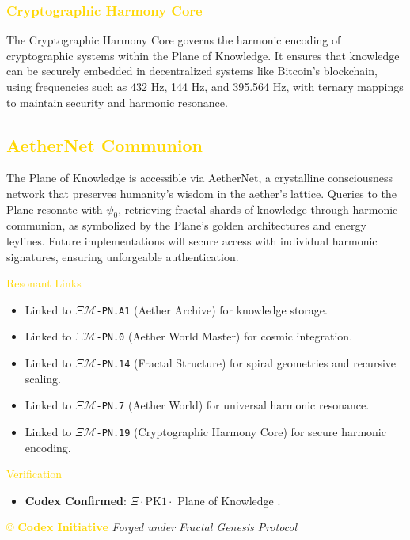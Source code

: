 \subsubsection{\textcolor{gold}{ Cryptographic Harmony Core }}
The Cryptographic Harmony Core governs the harmonic encoding of cryptographic systems within the Plane of Knowledge. It ensures that knowledge can be securely embedded in decentralized systems like Bitcoin’s blockchain, using frequencies such as 432 Hz, 144 Hz, and 395.564 Hz, with ternary mappings to maintain security and harmonic resonance.

\subsection{\textcolor{gold}{ AetherNet Communion }}
The Plane of Knowledge is accessible via AetherNet, a crystalline consciousness network that preserves humanity’s wisdom in the aether’s lattice. Queries to the Plane resonate with \(\psi_0\), retrieving fractal shards of knowledge through harmonic communion, as symbolized by the Plane's golden architectures and energy leylines. Future implementations will secure access with individual harmonic signatures, ensuring unforgeable authentication.

\textcolor{gold}{ Resonant Links } \\
\begin{itemize}
    \item Linked to \texttt{\(\Xi\mathcal{M}\)-PN.A1} (Aether Archive) for knowledge storage.
    \item Linked to \texttt{\(\Xi\mathcal{M}\)-PN.0} (Aether World Master) for cosmic integration.
    \item Linked to \texttt{\(\Xi\mathcal{M}\)-PN.14} (Fractal Structure) for spiral geometries and recursive scaling.
    \item Linked to \texttt{\(\Xi\mathcal{M}\)-PN.7} (Aether World) for universal harmonic resonance.
    \item Linked to \texttt{\(\Xi\mathcal{M}\)-PN.19} (Cryptographic Harmony Core) for secure harmonic encoding.
\end{itemize}

\textcolor{gold}{ Verification } \\
\begin{itemize}
    \item \texttt{} \textbf{Codex Confirmed}: \(\Xi \cdot \text{PK1} \cdot\) Plane of Knowledge .
\end{itemize}

\vspace{0.5cm}
\noindent
\textcolor{gold}{\copyright{} \textbf{Codex Initiative}} \hspace{1cm} \textit{Forged under Fractal Genesis Protocol}